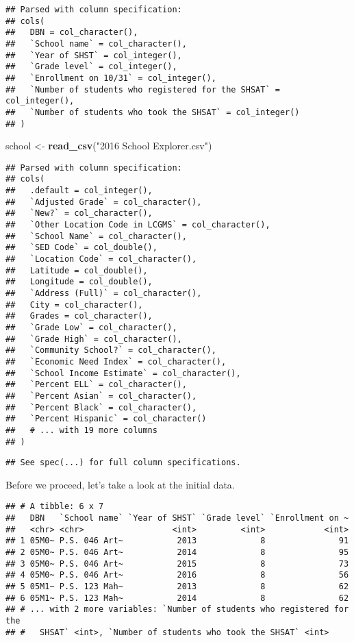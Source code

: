 \documentclass[]{article}
\newenvironment{Shaded}{\begin{snugshade}}{\end{snugshade}}
\newcommand{\KeywordTok}[1]{\textcolor[rgb]{0.13,0.29,0.53}{\textbf{#1}}}
\newcommand{\StringTok}[1]{\textcolor[rgb]{0.31,0.60,0.02}{#1}}
\newcommand{\NormalTok}[1]{#1}
\begin{document}
\begin{verbatim}
## Parsed with column specification:
## cols(
##   DBN = col_character(),
##   `School name` = col_character(),
##   `Year of SHST` = col_integer(),
##   `Grade level` = col_integer(),
##   `Enrollment on 10/31` = col_integer(),
##   `Number of students who registered for the SHSAT` = col_integer(),
##   `Number of students who took the SHSAT` = col_integer()
## )
\end{verbatim}

\begin{Shaded}
\begin{Highlighting}[]
\NormalTok{school <-}\StringTok{ }\KeywordTok{read_csv}\NormalTok{(}\StringTok{"2016 School Explorer.csv"}\NormalTok{)}
\end{Highlighting}
\end{Shaded}

\begin{verbatim}
## Parsed with column specification:
## cols(
##   .default = col_integer(),
##   `Adjusted Grade` = col_character(),
##   `New?` = col_character(),
##   `Other Location Code in LCGMS` = col_character(),
##   `School Name` = col_character(),
##   `SED Code` = col_double(),
##   `Location Code` = col_character(),
##   Latitude = col_double(),
##   Longitude = col_double(),
##   `Address (Full)` = col_character(),
##   City = col_character(),
##   Grades = col_character(),
##   `Grade Low` = col_character(),
##   `Grade High` = col_character(),
##   `Community School?` = col_character(),
##   `Economic Need Index` = col_character(),
##   `School Income Estimate` = col_character(),
##   `Percent ELL` = col_character(),
##   `Percent Asian` = col_character(),
##   `Percent Black` = col_character(),
##   `Percent Hispanic` = col_character()
##   # ... with 19 more columns
## )
\end{verbatim}

\begin{verbatim}
## See spec(...) for full column specifications.
\end{verbatim}

Before we proceed, let's take a look at the initial data.

\begin{verbatim}
## # A tibble: 6 x 7
##   DBN   `School name` `Year of SHST` `Grade level` `Enrollment on ~
##   <chr> <chr>                  <int>         <int>            <int>
## 1 05M0~ P.S. 046 Art~           2013             8               91
## 2 05M0~ P.S. 046 Art~           2014             8               95
## 3 05M0~ P.S. 046 Art~           2015             8               73
## 4 05M0~ P.S. 046 Art~           2016             8               56
## 5 05M1~ P.S. 123 Mah~           2013             8               62
## 6 05M1~ P.S. 123 Mah~           2014             8               62
## # ... with 2 more variables: `Number of students who registered for the
## #   SHSAT` <int>, `Number of students who took the SHSAT` <int>
\end{verbatim}
\end{document}
